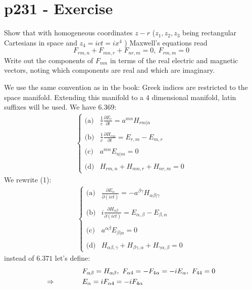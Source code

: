 \section{p231 - Exercise}
\begin{tcolorbox}
Show that with homogeneous coordinates $z-r$ ($z_1,z_2,z_3$ being rectangular Cartesians in space and $z_4= ict=ix^4$ ) Maxwell's equations read
$$ F_{rm,n}+F_{mn,r}+F_{nr,m}=0, \ F_{rm,m}=0$$
Write out the components of $F_{mn}$ in terms of the real electric and magnetic vectors, noting which components are real and which are imaginary.
\end{tcolorbox}
We use the same convention as in the book: Greek indices are restricted to the space manifold. Extending this manifold to a $4$ dimensional manifold, latin suffixes will be used.
We have $\mathbf{6.369}$:
\begin{align}
\left\{\begin{array}{ll}
\text{(a)}&\frac{1}{c}\frac{\partial E_r}{\partial t}= a^{mn}H_{rm|n}\\\\
\text{(b)}&\frac{1}{c}\frac{\partial H_{rm}}{\partial t}= E_{r,m}-E_{m,r}\\\\
\text{(c)}&a^{mn}E_{n|m}=0\\\\
\text{(d)}&H_{rm,n}+H_{mn,r}+H_{nr,m}=0
\end{array}\right.
\end{align}
We rewrite (1):
\begin{align}
\left\{\begin{array}{ll}
\text{(a)}&\frac{\partial E_{\alpha}}{\partial (ict)}= -a^{\beta\gamma}H_{\alpha\beta|\gamma}\\\\
\text{(b)}&i\frac{\partial H_{\alpha\beta}}{\partial (ict)}= E_{\alpha,\beta}-E_{\beta,\alpha}\\\\
\text{(c)}&a^{\alpha\beta}E_{\beta|\alpha}=0\\\\
\text{(d)}&H_{\alpha\beta,\gamma}+H_{\beta\gamma,\alpha}+H_{\gamma\alpha,\beta}=0
\end{array}\right.
\end{align}
instead of  $\mathbf{6.371}$ let's define:
\begin{align}
&F_{\alpha\beta} =H_{\alpha\beta} , \  F_{\alpha4} =-F_{4\alpha} =-iE_{\alpha}, \ F_{44}=0\\
\Rightarrow \quad\quad\quad\quad &E_{\alpha}= iF_{\alpha4} =-iF_{4\alpha}
\end{align}

